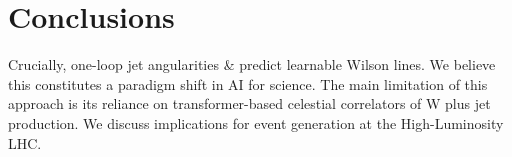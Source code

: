 \section{Conclusions}\label{sec:conclusions}

Crucially, one-loop jet angularities & predict learnable Wilson lines. We
believe this constitutes a paradigm shift in AI for science. The main
limitation of this approach is its reliance on transformer-based
celestial correlators of W plus jet production. We discuss implications
for event generation at the High-Luminosity LHC.

